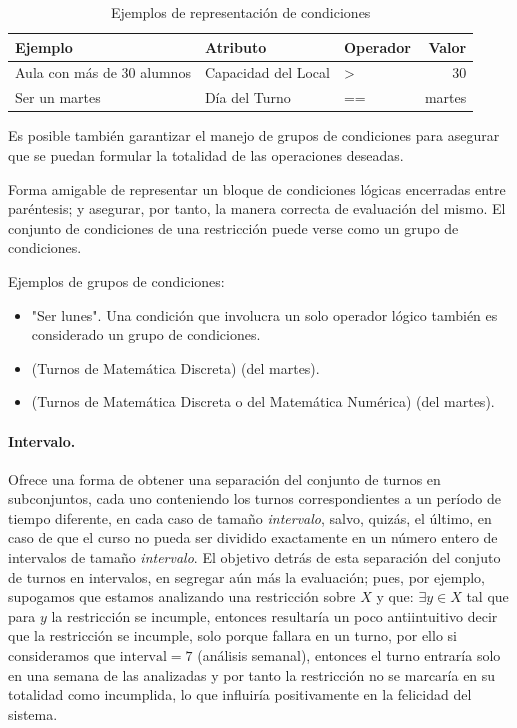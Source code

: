 \begin{table}[h]
	\centering
	\begin{tabular}[c]{l|l|l|r}
		\textbf{Ejemplo}                   & \textbf{Atributo}     & \textbf{Operador} & \textbf{Valor} \\ 
		\hline 
		Aula con más de 30 alumnos         &  Capacidad del Local  & >                 & 30             \\ 
		Ser un martes					   & Día del Turno         & ==                & martes
	\end{tabular}
	\caption{Ejemplos de representación de condiciones}
	\label{tab:conditions}		
\end{table}

Es posible también garantizar el manejo de grupos de condiciones para asegurar que se puedan formular la totalidad de las operaciones deseadas.

\begin{dfn}
	Forma amigable de representar un bloque de condiciones lógicas encerradas entre paréntesis; y asegurar, por tanto, la manera correcta de evaluación del mismo. El conjunto de condiciones de una restricción puede verse como un grupo de condiciones.
\end{dfn}

Ejemplos de grupos de condiciones: 
\begin{itemize}
	\item "Ser lunes". Una condición que involucra un solo operador lógico también es considerado un grupo de condiciones.
	\item (Turnos de Matemática Discreta) (del martes). 
	\item (Turnos de Matemática Discreta o del Matemática Numérica) (del martes).
\end{itemize}

\paragraph{Intervalo.}
Ofrece una forma de obtener una separación del  conjunto de turnos en subconjuntos, cada uno conteniendo los turnos correspondientes a un período de tiempo diferente, en cada caso de tamaño \textit{intervalo}, salvo, quizás, el último, en caso de que el curso no pueda ser dividido exactamente en un número 
entero de intervalos de tamaño \textit{intervalo}. El objetivo detrás de esta separación del conjuto de turnos en intervalos, en segregar aún más la evaluación; pues, por ejemplo, supogamos que estamos analizando una restricción sobre $X$ y que: $\exists y \in X $ tal que para $y$ la restricción se incumple, entonces resultaría un poco antiintuitivo decir que la restricción se incumple, solo porque fallara en un turno, por ello si consideramos que $\text{interval} = 7$ (análisis semanal), entonces el turno entraría solo en una semana de las analizadas y por tanto la restricción no se marcaría en su totalidad como incumplida, lo que influiría positivamente en la felicidad del sistema.

